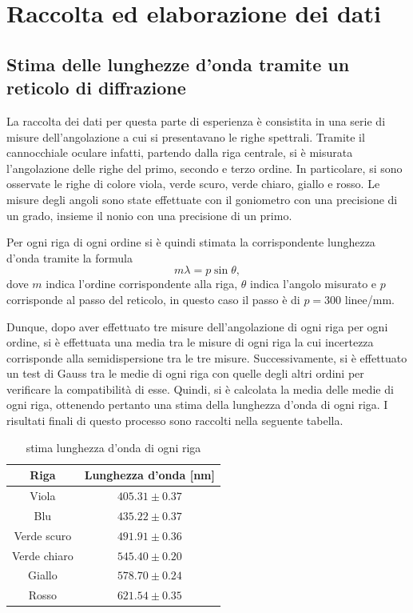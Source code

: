 \documentclass{article}
\begin{document}
\section{Raccolta ed elaborazione dei dati}
\subsection{Stima delle lunghezze d'onda tramite un reticolo di diffrazione}
La raccolta dei dati per questa parte di esperienza è consistita in una serie di misure dell'angolazione a cui si presentavano le righe spettrali. Tramite il cannocchiale oculare infatti, partendo dalla riga centrale, si è misurata l'angolazione delle righe del primo, secondo e terzo ordine. In particolare, si sono osservate le righe di colore viola, verde scuro, verde chiaro, giallo e rosso. Le misure degli angoli sono state effettuate con il goniometro con una precisione di un grado, insieme il nonio con una precisione di un primo. 

Per ogni riga di ogni ordine si è quindi stimata la corrispondente lunghezza d'onda tramite la formula
\begin{equation}
    \label{eq:lambda reticolo}
    m\lambda=p\sin{\theta},
\end{equation}
dove $m$ indica l'ordine corrispondente alla riga, $\theta$ indica l'angolo misurato e $p$ corrisponde al passo del reticolo, in questo caso il passo è di $p=300$ linee/mm.

Dunque, dopo aver effettuato tre misure dell'angolazione di ogni riga per ogni ordine, si è effettuata una media tra le misure di ogni riga la cui incertezza corrisponde alla semidispersione tra le tre misure. Successivamente, si è effettuato un test di Gauss tra le medie di ogni riga con quelle degli altri ordini per verificare la compatibilità di esse. Quindi, si è calcolata la media delle medie di ogni riga, ottenendo pertanto una stima della lunghezza d'onda di ogni riga. I risultati finali di questo processo sono raccolti nella seguente tabella.
\begin{table}[ht]
    \centering
    \begin{tabular}{|c|c|}
        \hline
        \textbf{Riga} & \textbf{Lunghezza d'onda [nm]} \\
        \hline
        Viola & $405.31\pm0.37$ \\
        \hline
        Blu & $435.22\pm0.37$ \\
        \hline
        Verde scuro & $491.91\pm0.36$ \\
        \hline
        Verde chiaro & $545.40\pm0.20$ \\
        \hline
        Giallo & $578.70\pm0.24$ \\
        \hline
        Rosso & $621.54\pm0.35$ \\
        \hline
    \end{tabular}
    \caption{stima lunghezza d'onda di ogni riga}
    \label{tab:stima lunghezza d'onda}
\end{table}
\end{document}
